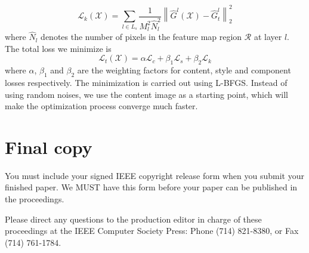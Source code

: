 \documentclass[10pt,twocolumn,letterpaper]{article}
\begin{document}
\begin{equation}
\mathcal{L}_{k} \left( \mathcal{X} \right) = \sum\limits_{l \in {L_s}} {\frac{1}{{M_l^2{\hat N}_l^2}}\left\| {{{\hat G}^l}\left( \mathcal{X} \right) - {\hat G}_t^l} \right\|_2^2} 
\label{eq:component_loss}
\end{equation}
where ${\hat N}_l$ denotes the number of pixels in the feature map region $\mathcal R$ at layer $l$. The total loss we minimize is 
\begin{equation}
\mathcal{L}_{t}\left( \mathcal{X} \right) = \alpha \mathcal{L}_{c} + \beta_1 \mathcal{L}_{s} + \beta_2 \mathcal{L}_{k}
\label{eq:Total_loss}
\end{equation}
where $\alpha$, $\beta_1$ and $\beta_2$ are the weighting factors for content, style and component losses respectively. The minimization is carried out using L-BFGS. Instead of using random noises, we use the content image as a starting point, which will make the optimization process converge much faster. 

\section{Final copy}

You must include your signed IEEE copyright release form when you submit
your finished paper. We MUST have this form before your paper can be
published in the proceedings.

Please direct any questions to the production editor in charge of these
proceedings at the IEEE Computer Society Press: Phone (714) 821-8380, or
Fax (714) 761-1784.

{\small


}
\end{document}
